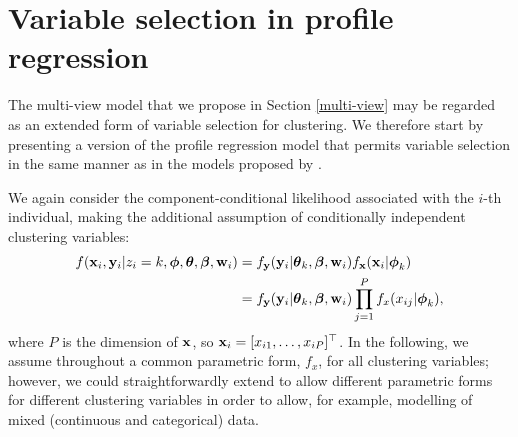 \documentclass[12pt]{article}
\begin{document}

\section{Variable selection in profile regression}\label{variable_selection}
The multi-view model that we propose in Section \ref{multi-view} may be regarded as an extended form of variable selection for clustering.  We therefore start by presenting a version of the profile regression model that permits variable selection in the same manner as in the models proposed by \citet{Law2003,Law2004,Tadesse2005,Papathomas2012}.  


We again consider the component-conditional likelihood associated with the $i$-th individual, making the additional assumption of conditionally independent clustering variables:%
\begin{align}
f(\mathbf{x}_i,\mathbf{y}_i | z_i = k, \boldsymbol{\phi}, \boldsymbol{\theta}, \boldsymbol{\beta}, {\bf w}_i) &= f_\mathbf{y}({\bf y}_i|\boldsymbol{\theta}_k,\boldsymbol{\beta},\mathbf{w}_i)f_\mathbf{x}(\mathbf{x}_i | \boldsymbol{\phi}_k)\notag\\
&= f_{\bf y}({\bf y}_i|\boldsymbol{\theta}_k,\boldsymbol{\beta},\mathbf{w}_i)\prod_{j=1}^P f_x(x_{ij} | \boldsymbol{\phi}_k)\label{profRegr},\vspace{-0.5cm}
\end{align}
where $P$ is the dimension of ${\bf x}$, so ${\bf x}_i = [x_{i1}, \ldots, x_{iP}]^\top$.  In the following, we assume throughout a common parametric form, $f_x$, for all clustering variables; however, we could straightforwardly extend to allow different parametric forms for different clustering variables in order to allow, for example, modelling of mixed (continuous and categorical) data.
\end{document}
